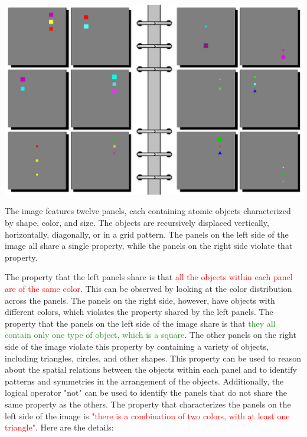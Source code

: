 \begin{tcolorbox}[breakable,enhanced jigsaw,opacityback=0,]
	\centering
	\includegraphics[width=.8\linewidth]{imgs/bongard/easy-17.png}\\
	\begin{dialogue}
		 The image features twelve panels, each containing atomic objects characterized by shape, color, and size. The objects are recursively displaced vertically, horizontally, diagonally, or in a grid pattern. The panels on the left side of the image all share a single property, while the panels on the right side violate that property.
		
		The property that the left panels share is that \textcolor{red}{all the objects within each panel are of the same color}. This can be observed by looking at the color distribution across the panels. The panels on the right side, however, have objects with different colors, which violates the property shared by the left panels.
		\vspace{1em}
		 The property that the panels on the left side of the image share is that \textcolor{ForestGreen}{they all contain only one type of object, which is a square}. The other panels on the right side of the image violate this property by containing a variety of objects, including triangles, circles, and other shapes. This property can be used to reason about the spatial relations between the objects within each panel and to identify patterns and symmetries in the arrangement of the objects. Additionally, the logical operator "not" can be used to identify the panels that do not share the same property as the others.
		\vspace{1em}
		 The property that characterizes the panels on the left side of the image is \textcolor{red}{"there is a combination of two colors, with at least one triangle"}. Here are the details:
		

\end{dialogue}
\end{tcolorbox}
